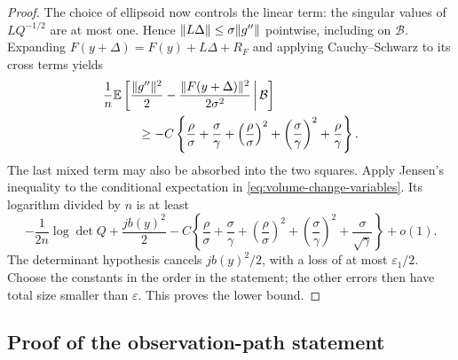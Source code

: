 \begin{proof}
The choice of ellipsoid now controls the linear term: the singular
values of $LQ^{-1/2}$ are at most one. Hence
$\lVert L\Delta\rVert\le\sigma\lVert g''\rVert$ pointwise, including on
$\mathcal B$.  Expanding
$F(y+\Delta)=F(y)+L\Delta+R_F$ and applying Cauchy--Schwarz to its
cross terms yields
\begin{align*}
 &\frac1n\mathbb E\left[
 \frac{\lVert g''\rVert^2}{2}
 -\frac{\lVert F(y+\Delta)\rVert^2}{2\sigma^2}
 \,\middle|\,\mathcal B\right]\\
 &\hspace{1cm}\ge
 -C\left\{
 \frac\rho\sigma+\frac\sigma\gamma
 +\left(\frac\rho\sigma\right)^2
 +\left(\frac\sigma\gamma\right)^2
 +\frac\rho\gamma\right\}.
\end{align*}
The last mixed term may also be absorbed into the two squares.
Apply Jensen's inequality to the conditional expectation in
\eqref{eq:volume-change-variables}.  Its logarithm divided by $n$ is
at least
\[
 -\frac{1}{2n}\log\det Q+\frac{jb(y)^2}{2}
 -C\left\{\frac\rho\sigma+\frac\sigma\gamma
          +\left(\frac\rho\sigma\right)^2
          +\left(\frac\sigma\gamma\right)^2
          +\frac\sigma{\sqrt\gamma}\right\}+o(1).
\]
The determinant hypothesis cancels $jb(y)^2/2$, with a loss of at
most $\varepsilon_1/2$. Choose the constants in the order in the
statement; the other errors then have total size smaller than
$\varepsilon$. This proves the lower bound.
\end{proof}

\subsection{Proof of the observation-path statement}

